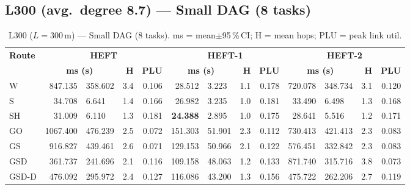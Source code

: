 \documentclass[11pt]{article}
\newcommand{\win}[1]{\textcolor{green!50!black}{\textbf{#1}}}
\newcommand{\bad}[1]{\textcolor{red!70!black}{#1}}
\begin{document}
\subsection{L300 (avg.\ degree 8.7) --- Small DAG (8 tasks)}
\begin{table}[H]\centering\small
\begin{tabular}{l r@{$\pm$}l r r r@{$\pm$}l r r r@{$\pm$}l r r}
\toprule
\textbf{Route} & \multicolumn{4}{c}{\textbf{HEFT}} & \multicolumn{4}{c}{\textbf{HEFT-1}} & \multicolumn{4}{c}{\textbf{HEFT-2}} \\
\cmidrule(lr){2-5}\cmidrule(lr){6-9}\cmidrule(lr){10-13}
& \multicolumn{2}{c}{\textbf{ms (s)}} & \textbf{H} & \textbf{PLU}& \multicolumn{2}{c}{\textbf{ms (s)}} & \textbf{H} & \textbf{PLU}& \multicolumn{2}{c}{\textbf{ms (s)}} & \textbf{H} & \textbf{PLU} \\
\midrule
  W & 847.135 & 358.602 & 3.4 & 0.106 & 28.512 & 3.223 & 1.1 & 0.178 & 720.078 & 348.734 & 3.1 & 0.120 \\
  S & 34.708 & 6.641 & 1.4 & 0.166 & 26.982 & 3.235 & 1.0 & 0.181 & 33.490 & 6.498 & 1.3 & 0.168 \\
  SH & 31.009 & 6.110 & 1.3 & 0.181 & \win{24.388} & 2.895 & 1.0 & 0.175 & 28.641 & 5.516 & 1.2 & 0.171 \\
  GO & \bad{1067.400} & 476.239 & 2.5 & 0.072 & \bad{151.303} & 51.901 & 2.3 & 0.112 & 730.413 & 421.413 & 2.3 & 0.083 \\
  GS & 916.827 & 439.461 & 2.6 & 0.071 & 129.153 & 50.966 & 2.1 & 0.122 & 576.451 & 332.842 & 2.3 & 0.083 \\
  GSD & 361.737 & 241.696 & 2.1 & 0.116 & 109.158 & 48.063 & 1.2 & 0.133 & \bad{871.740} & 315.716 & 3.8 & 0.073 \\
  GSD-D & 476.092 & 295.972 & 2.4 & 0.127 & 116.086 & 43.200 & 1.3 & 0.156 & 475.722 & 262.206 & 2.7 & 0.119 \\
\bottomrule\end{tabular}
\caption{L300 ($L=300$\,m) --- Small DAG (8 tasks). ms = mean$\pm$95\,\%\,CI; H = mean hops; PLU = peak link util.}
\end{table}
\end{document}
